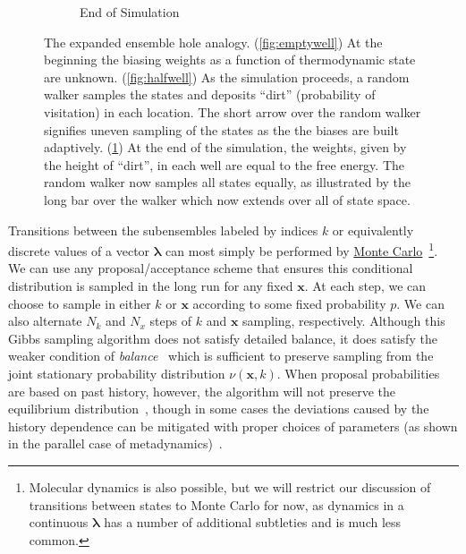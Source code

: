 \documentclass[9pt,review]{livecoms}
\newcommand{\vx}{\mathbf{x}}
\begin{document}
\begin{figure}[ht]
\begin{subfigure}[b]{0.33\textwidth}
\caption{End of Simulation}
\label{fig:fullwell}
\end{subfigure}
\caption{The expanded ensemble hole analogy. (\ref{fig:emptywell}) At the beginning the biasing weights as a function of thermodynamic state are unknown. (\ref{fig:halfwell}) As the simulation proceeds, a random walker samples the states and deposits ``dirt'' (probability of visitation) in each location.  The short arrow over the random walker signifies uneven sampling of the states as the the biases are built adaptively.  (\ref{fig:fullwell}) At the end of the simulation, the weights, given by the height of ``dirt'', in each well are equal to the free energy.  The random walker now samples all states equally, as illustrated by the long bar over the walker which now extends over all of state space.} \label{fig:EXEanalogy}
\end{figure}

Transitions between the subensembles labeled by indices $k$ or equivalently discrete values of a vector $\mathbf{\lambda}$ can most simply be performed by \hyperlink{ref:MetropolisMonteCarlo} {Monte Carlo}~\footnote{Molecular dynamics is also possible, but we will restrict our discussion of transitions
between states to Monte Carlo for now, as dynamics in a continuous $\mathbf{\lambda}$ has a number of additional subtleties and is much less common.}.  We can use any proposal/acceptance scheme that ensures this conditional distribution is sampled in the long run for any fixed $\vx$. At each step, we can choose to sample in either $k$ or $\vx$ according to some fixed probability $p$.  We can also alternate $N_k$ and $N_x$ steps of $k$ and $\vx$ sampling, respectively.  Although this Gibbs sampling algorithm does not satisfy detailed balance, it does satisfy the weaker condition of \emph{balance}~\cite{deem:jcp:1999:balance} which is sufficient to preserve sampling from the joint stationary probability distribution $\nu(\vx,k)$.  When proposal probabilities are based on past history, however, the algorithm will not preserve the equilibrium distribution~\cite{reinhardt:cpl:2000:step-size-adjustment}, though in some cases the deviations caused by the history dependence can be mitigated with proper choices of parameters (as shown in the parallel case of metadynamics)~\cite{bussi.equilibriummetadynamics}.
\end{document}
